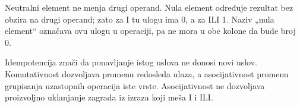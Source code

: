 
Neutralni element ne menja drugi operand. Nula element određuje rezultat bez obzira na drugi operand; zato za I tu ulogu ima 0, a za ILI 1. Naziv „nula element“ označava ovu ulogu u operaciji, pa ne mora u obe kolone da bude broj 0.

Idempotencija znači da ponavljanje istog uslova ne donosi novi uslov. Komutativnost dozvoljava promenu redosleda ulaza, a asocijativnost promenu grupisanja uzastopnih operacija iste vrste. Asocijativnost ne dozvoljava proizvoljno uklanjanje zagrada iz izraza koji meša I i ILI.
